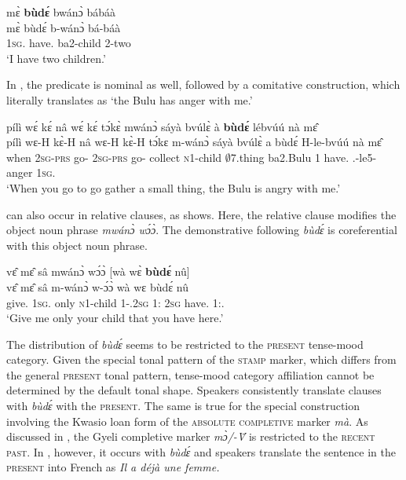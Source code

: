 \ea \label{bude1}
  \glll  mɛ̀ {\bfseries bùdɛ́} bwánɔ̀ bábáà \\
        mɛ̀ bùdɛ́ b-wánɔ̀ bá-báà \\
         1\textsc{sg}.{\SBJ} have.{\R} ba2-child 2-two\\
    \trans `I have two children.'
\z

\noindent In , the predicate is nominal as well, followed by a comitative construction, which literally translates as `the Bulu has anger with me.'

\ea \label{bude2}
  \glll pílì wɛ́ kɛ́ nâ wɛ́ kɛ́ tɔ́kɛ̀ mwánɔ̀ sáyà bvúlɛ̀ à {\bfseries bùdɛ́} lébvúú nà mɛ̂ \\
        pílì wɛ-H kɛ̀-H nâ wɛ-H kɛ̀-H tɔ́kɛ m-wánɔ̀ sáyà bvúlɛ̀ a bùdɛ́ H-le-bvúú nà mɛ̂ \\
           when 2\textsc{sg}-\textsc{prs} go-{\R} {\COMP} 2\textsc{sg}-\textsc{prs} go-{\R} collect \textsc{n}1-child $\emptyset$7.thing ba2.Bulu 1 have.{\R} {\OBJ}.{\LINK}-le5-anger {\COM} 1\textsc{sg}.{\OBJ} \\
    \trans `When you go to go gather a small thing, the Bulu is angry with me.'
\z

 can also occur in relative clauses, as  shows. Here, the relative clause modifies the object noun phrase {\itshape mwánɔ̀ wɔ́ɔ̀}. The demonstrative following {\itshape bùdɛ́} is coreferential with this object noun phrase.

\ea \label{bude3}
  \glll  vɛ̂ mɛ̂ sâ mwánɔ̀ wɔ́ɔ̀ [wà wɛ̀ {\bfseries bùdɛ́} nû]\textsubscript{{\REL}} \\
         vɛ̂ mɛ̂ sâ m-wánɔ̀ w-ɔ́ɔ̀ {\db}wà wɛ bùdɛ́ nû \\
          give.{\IMP} 1\textsc{sg}.{\OBJ} only \textsc{n}1-child 1-{\POSS}.2\textsc{sg} {\db}1:{\ATT} 2\textsc{sg} have.{\R} 1:\DEM.{\PROX} \\
    \trans `Give me only your child that you have here.'
\z


The distribution of {\itshape bùdɛ́} seems to be restricted to the \textsc{present} tense-mood category. Given the special tonal pattern of the \textsc{stamp} marker, which differs from the general \textsc{present} tonal pattern, tense-mood category affiliation cannot be determined by the default tonal shape. Speakers consistently translate clauses with {\itshape bùdɛ́} with the \textsc{present}. The same is true for the special construction involving the Kwasio loan form of the \textsc{absolute completive} marker {\itshape mà}. As discussed in , the Gyeli completive marker {\itshape mɔ̀/-Ṽ} is restricted to the \textsc{recent past}. In , however, it occurs with {\itshape bùdɛ́} and speakers translate the sentence in the \textsc{present} into French as {\itshape Il a déjà une femme.}



